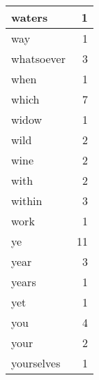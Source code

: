 \begin{center}
\begin{longtable}{l|r}
waters & 1 \\ \hline
way & 1 \\ \hline
whatsoever & 3 \\ \hline
when & 1 \\ \hline
which & 7 \\ \hline
widow & 1 \\ \hline
wild & 2 \\ \hline
wine & 2 \\ \hline
with & 2 \\ \hline
within & 3 \\ \hline
work & 1 \\ \hline
ye & 11 \\ \hline
year & 3 \\ \hline
years & 1 \\ \hline
yet & 1 \\ \hline
you & 4 \\ \hline
your & 2 \\ \hline
yourselves & 1 \\ \hline
\end{longtable}
\end{center}



\normalsize



